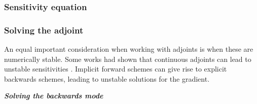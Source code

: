 \subsubsection{Sensitivity equation}

\subsubsection{Solving the adjoint}


An equal important consideration when working with adjoints is when these are numerically stable. 
Some works had shown that continuous adjoints can lead to unstable sensitivities \cite{Jensen_Nakshatrala_Tortorelli_2014}.
Implicit forward schemes can give rise to explicit backwards schemes, leading to unstable solutions for the gradient. 

\vspace*{10px}
\noindent \textbf{\textit{Solving the backwards mode}}
\vspace*{5px}

